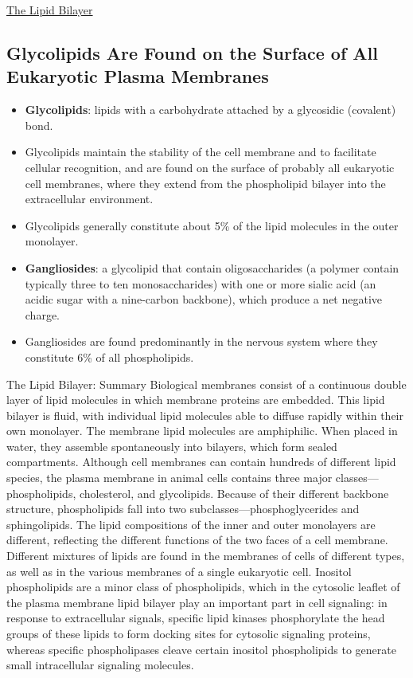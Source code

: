 \documentclass[12pt,letterpaper]{article}
\begin{document}
\begin{secbox}{\hyperlink{10}{The Lipid Bilayer}}
{    \hypertarget{10.6}{\subsection*{Glycolipids Are Found on the Surface of All Eukaryotic Plasma Membranes}}
    \begin{itemize}
        \item \textbf{Glycolipids}: lipids with a carbohydrate attached by a glycosidic (covalent) bond.
        \item Glycolipids maintain the stability of the cell membrane and to facilitate cellular recognition, and are found on the surface of probably all eukaryotic cell membranes, where they extend from the phospholipid bilayer into the extracellular environment. 
        \item Glycolipids generally constitute about 5\% of the lipid molecules in the outer monolayer. 
        \item \textbf{Gangliosides}: a glycolipid that contain oligosaccharides (a polymer contain typically three to ten monosaccharides) with one or more sialic acid (an acidic sugar with a nine-carbon backbone), which produce a net negative charge.
        \item  Gangliosides are found predominantly in the nervous system where they constitute 6\% of all phospholipids.
    \end{itemize}

    \begin{probbox}{The Lipid Bilayer: Summary}
        Biological membranes consist of a continuous double layer of lipid molecules in which membrane proteins are embedded. This lipid bilayer is fluid, with individual lipid molecules able to diffuse rapidly within their own monolayer. The membrane lipid molecules are amphiphilic. When placed in water, they assemble spontaneously into bilayers, which form sealed compartments. Although cell membranes can contain hundreds of different lipid species, the plasma membrane in animal cells contains three major classes—phospholipids, cholesterol, and glycolipids. Because of their different backbone structure, phospholipids fall into two subclasses—phosphoglycerides and sphingolipids. The lipid compositions of the inner and outer monolayers are different, reflecting the different functions of the two faces of a cell membrane. Different mixtures of lipids are found in the membranes of cells of different types, as well as in the various membranes of a single eukaryotic cell. Inositol phospholipids are a minor class of phospholipids, which in the cytosolic leaflet of the plasma membrane lipid bilayer play an important part in cell signaling: in response to extracellular signals, specific lipid kinases phosphorylate the head groups of these lipids to form docking sites for cytosolic signaling proteins, whereas specific phospholipases cleave certain inositol phospholipids to generate small intracellular signaling molecules.
    \end{probbox}
}\end{secbox}
\end{document}
